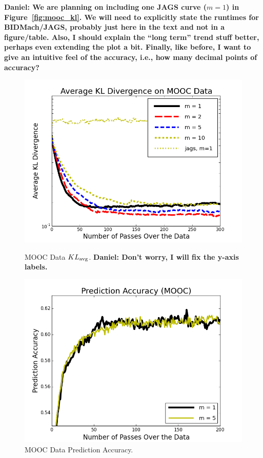 \documentclass{article} %
\begin{document}
\textbf{Daniel: We are planning on including one JAGS curve ($m=1$) in Figure~\ref{fig:mooc_kl}. We
will need to explicitly state the runtimes for BIDMach/JAGS, probably just here in the text and not
in a figure/table. Also, I should explain the ``long term'' trend stuff better, perhaps even
extending the plot a bit. Finally, like before, I want to give an intuitive feel of the accuracy,
i.e., how many decimal points of accuracy?}

\begin{figure}[t]
  \centering
  \begin{minipage}{.5\textwidth}
    \centering
    \includegraphics[width=1\textwidth]{fig_mooc_kl_div.png}
    \caption{MOOC Data $KL_{\rm avg}$. \textbf{Daniel: Don't worry, I will fix the y-axis labels.}}
    \label{fig:mooc_kl}
  \end{minipage}\hfill
    \begin{minipage}{.5\textwidth}
    \centering
    \includegraphics[width=1\textwidth]{fig_prediction_accuracy_mooc}
    \caption{MOOC Data Prediction Accuracy.}
    \label{fig:mooc_accuracy}
  \end{minipage}
\end{figure}
\end{document}
